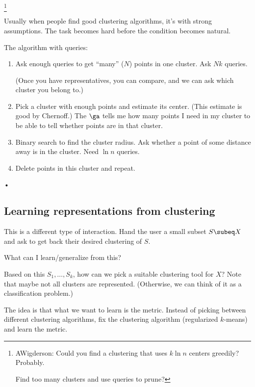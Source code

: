 \footnote{AWigderson: Could you find a clustering that uses $k\ln n$ centers greedily? Probably. 

Find too many clusters and use queries to prune?}

Usually when people find good clustering algorithms, it's with strong assumptions.
The task becomes hard before the condition becomes natural.

The algorithm with queries:
\begin{enumerate}
\item
Ask enough queries to get ``many'' ($N$) points in one cluster. Ask $Nk$ queries.

(Once you have representatives, you can compare, and we can ask which cluster you belong to.)
\item
Pick a cluster with enough points and estimate its center. (This estimate is good by Chernoff.)
The $\ga$ tells me how many points I need in my cluster to be able to tell whether points are in that cluster.
\item
Binary search to find the cluster radius. Ask whether a point of some distance away is in the cluster. Need $\ln n$ queries.
\item
Delete points in this cluster and repeat.
\end{enumerate}•





\subsection{Learning representations from clustering}

This is a different type of interaction. %
Hand the user a small subset $S\subeq X$ and ask to get back their desired clustering of $S$.

What can I learn/generalize from this?

Based on this $S_1,\ldots, S_k$, how can we pick a suitable clustering tool for $X$? Note that maybe not all clusters are represented. (Otherwise, we can think of it as a classification problem.)

The idea is that what we want to learn is the metric. Instead of picking between different clustering algorithms, fix the clustering algorithm (regularized $k$-means) and learn the metric.

